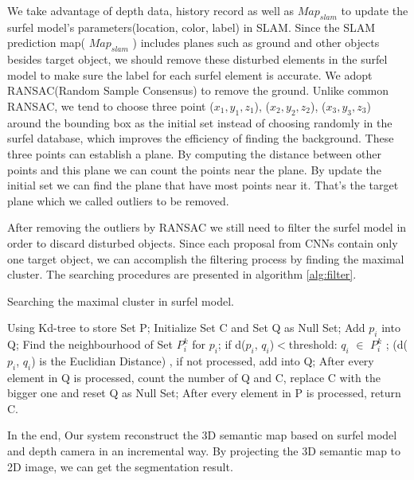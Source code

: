 \documentclass[conference]{IEEEtran}
\begin{document}
We take advantage of depth data, history record as well as $Map_{slam}$  to update the surfel model's parameters(location, color, label) in SLAM. Since the SLAM prediction map( $Map_{slam}$ ) includes planes such as ground and other objects besides target object, we should remove these disturbed elements in the surfel model to make sure the label for each surfel element is accurate. We adopt RANSAC(Random Sample Consensus) \cite{Fischler1981} to remove the ground. Unlike common RANSAC,  we tend to choose three point ($x_{1},y_{1},z_{1}$), ($x_{2},y_{2},z_{2}$), ($x_{3},y_{3},z_{3}$) around the bounding box as the initial set instead of choosing randomly in the surfel database, which improves the efficiency of finding the background. These three points can establish a plane. By computing the distance between other points and this plane we can count the points near the plane. By update the initial set we can find the plane that have most points near it. That's the target plane which we called outliers to be removed. 

After removing the outliers by RANSAC we still need to filter the surfel model in order to discard disturbed objects. Since each proposal from CNNs contain only one target object, we can accomplish the filtering process by finding the maximal cluster. The searching procedures are presented in algorithm \ref{alg:filter}.

\begin{algorithm}[htbp]  
	\caption{ Searching the maximal cluster in surfel model.}  
	\label{alg:filter}  
	\begin{algorithmic}[1]  
		\State  Using Kd-tree to store Set P;
		\State  Initialize Set C and Set Q as Null Set;
		\State  Add  $p_{i}$  into  Q;
		\EndFor
		\State Find the neighbourhood of Set $P^k_{i}$ for $p_{i}$;  if d($p_{i}$, $q_{i}$)$<$threshold: $q_{i}$ $\in$ $P^k_{i}$ ; (d($p_{i}$, $q_{i}$) is the Euclidian Distance)
		\EndFor
		, 
		\State if not processed, add into Q;
		\State After every element in Q is processed, count the number of Q and C, replace C with the bigger one and reset Q as Null Set;
		\EndFor
		\State After every element in P is processed, return C.
	\end{algorithmic}  
\end{algorithm} 

In the end, Our system reconstruct the 3D semantic map based on surfel model and depth camera in an incremental way. By projecting the 3D semantic map to 2D image, we can get the segmentation result. 
\end{document}
